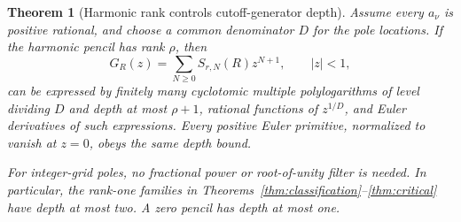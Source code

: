 \documentclass[11pt,letterpaper]{article}
\numberwithin{equation}{section}
\newtheorem{theorem}{Theorem}[section]
\theoremstyle{definition}\newtheorem{definition}[theorem]{Definition}
\theoremstyle{remark}\newtheorem{remark}[theorem]{Remark}
\begin{document}
\begin{theorem}[Harmonic rank controls cutoff-generator depth]
\label{thm:depth}
Assume every $a_\nu$ is positive rational, and choose a common denominator
$D$ for the pole locations. If the harmonic pencil has rank $\rho$, then
\begin{equation}\label{eq:generator-general}
 G_R(z)=\sum_{N\ge0}S_{r,N}(R)z^{N+1},\qquad |z|<1,
\end{equation}
can be expressed by finitely many cyclotomic multiple polylogarithms
of level dividing $D$ and depth at most $\rho+1$, rational functions
of $z^{1/D}$, and Euler derivatives of such expressions.
Every positive Euler primitive, normalized to vanish at $z=0$, obeys
the same depth bound.

For integer-grid poles, no fractional power or root-of-unity filter
is needed. In particular, the rank-one families in
Theorems~\ref{thm:classification}--\ref{thm:critical} have depth at
most two. A zero pencil has depth at most one.
\end{theorem}
\end{document}
